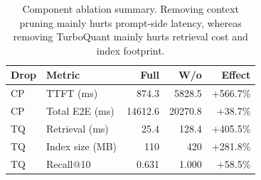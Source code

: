 \begin{table}[htbp]
\centering
\caption{Component ablation summary. Removing context pruning mainly hurts prompt-side latency, whereas removing TurboQuant mainly hurts retrieval cost and index footprint.}
\label{tab:component-ablation}
\small
\setlength{\tabcolsep}{2.5pt}
\begin{tabular}{l l r r r}
\toprule
Drop & Metric & Full & W/o & Effect \\
\midrule
CP & TTFT (ms) & 874.3 & 5828.5 & +566.7\% \\
CP & Total E2E (ms) & 14612.6 & 20270.8 & +38.7\% \\
TQ & Retrieval (ms) & 25.4 & 128.4 & +405.5\% \\
TQ & Index size (MB) & 110 & 420 & +281.8\% \\
TQ & Recall@10 & 0.631 & 1.000 & +58.5\% \\
\bottomrule
\end{tabular}
\end{table}
